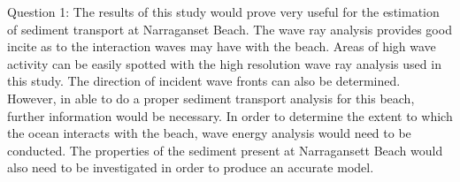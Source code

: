 
Question 1:
The results of this study would prove very useful for the estimation of sediment transport at Narraganset Beach. The wave ray analysis provides good incite as to the interaction waves may have with the beach. Areas of high wave activity can be easily spotted with the high resolution wave ray analysis used in this study. The direction of incident wave fronts can also be determined. However, in able to do a proper sediment transport analysis for this beach, further information would be necessary. In order to determine the extent to which the ocean interacts with the beach, wave energy analysis would need to be conducted. The properties of the sediment present at Narragansett Beach would also need to be investigated in order to produce an accurate model. 
